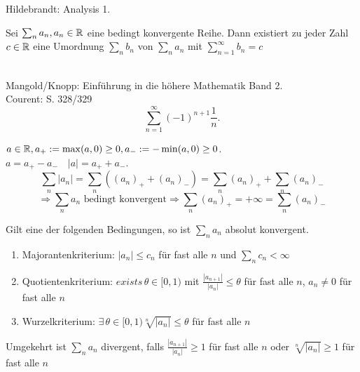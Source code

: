 \documentclass[../ana1.tex]{subfiles}
\begin{document}
\begin{bew}
    Hildebrandt: Analysis 1.
\end{bew}
\begin{satz}[Riemann]%
    Sei \( \sum_n a_n, a_n \in\mathbb{R} \) eine bedingt konvergente Reihe. Dann existiert zu jeder Zahl \( c\in\mathbb{R} \) eine Umordnung \( \sum_n b_n \) von \( \sum_n a_n \) mit \( \sum_{n=1}^\infty b_n = c \)
\end{satz}
\begin{bspe}\leavevmode \\
    Mangold/Knopp: Einführung in die höhere Mathematik Band 2.\\
    Courent:  S. 328/329
    \[ \sum_{n=1}^\infty {(-1)}^{n+1} \frac{1}{n}. \]
\end{bspe}
\begin{bem}
    \( a\in\mathbb{R}, a_+ := \max(a,0) \geq 0, a_- := -\min(a,0)\geq 0 \).\\
    \( a = a_+ - a_- \quad |a| = a_+ + a_- \).
    \[ \sum_n |a_n| = \sum_n \left( {(a_n)}_+ + {(a_n)}_- \right) = \sum_n {(a_n)}_+ + \sum_n {(a_n)}_- \]
    \[ \Rightarrow \sum_n a_n \text{ bedingt konvergent} \Rightarrow \sum_n {(a_n)}_+ = +\infty = \sum_n {(a_n)}_- \]
\end{bem}
\begin{satz}
    Gilt eine der folgenden Bedingungen, so ist \( \sum_n a_n \) absolut konvergent.
    \begin{enumerate}
        \item Majorantenkriterium: \( |a_n| \leq c_n \) für fast alle \(n\) und \( \sum_n c_n < \infty \)
        \item Quotientenkriterium: \( exists\, \theta \in [0,1) \) mit \( \frac{|a_{n+1}|}{|a_n|} \leq \theta \) für fast alle \(n\), \(a_n \neq 0\) für fast alle \(n\)
        \item Wurzelkriterium: \( \exists \, \theta \in [0,1) \sqrt[n]{|a_n|} \leq \theta \) für fast alle \(n\)
    \end{enumerate}
    Umgekehrt ist \( \sum_n a_n \) divergent, falls \( \frac{|a_{n+1}|}{|a_n|} \geq 1 \) für fast alle \(n\) oder \( \sqrt[n]{|a_n|} \geq 1 \) für fast alle \(n\)
\end{satz}
\end{document}
